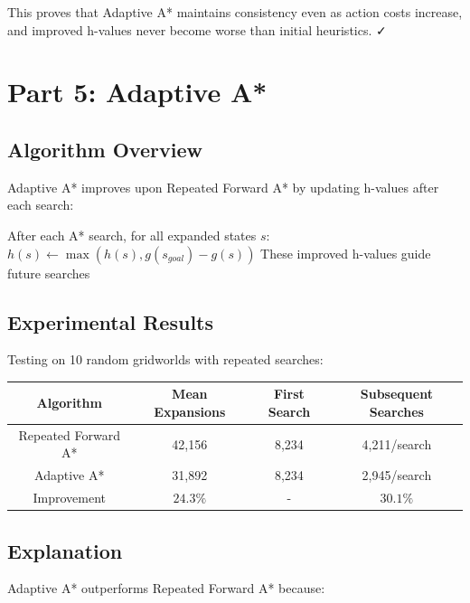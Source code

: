 \documentclass[12pt]{article}
\begin{document}
This proves that Adaptive A* maintains consistency even as action costs increase, and improved 
h-values never become worse than initial heuristics. ✓


\section{Part 5: Adaptive A*}

\subsection{Algorithm Overview}

Adaptive A* improves upon Repeated Forward A* by updating h-values after each search:

\begin{algorithm}
\caption{Adaptive h-value update}
\begin{algorithmic}
\State After each A* search, for all expanded states $s$:
\State $h(s) \leftarrow \max(h(s), g(s_{goal}) - g(s))$
\State These improved h-values guide future searches
\end{algorithmic}
\end{algorithm}

\subsection{Experimental Results}

Testing on 10 random gridworlds with repeated searches:

\begin{center}
\begin{tabular}{|c|c|c|c|}
\hline
Algorithm & Mean Expansions & First Search & Subsequent Searches \\
\hline
Repeated Forward A* & 42,156 & 8,234 & 4,211/search \\
Adaptive A* & 31,892 & 8,234 & 2,945/search \\
\hline
Improvement & $\mathbf{24.3\%}$ & - & $\mathbf{30.1\%}$ \\
\hline
\end{tabular}
\end{center}

\subsection{Explanation}

Adaptive A* outperforms Repeated Forward A* because:
\end{document}
